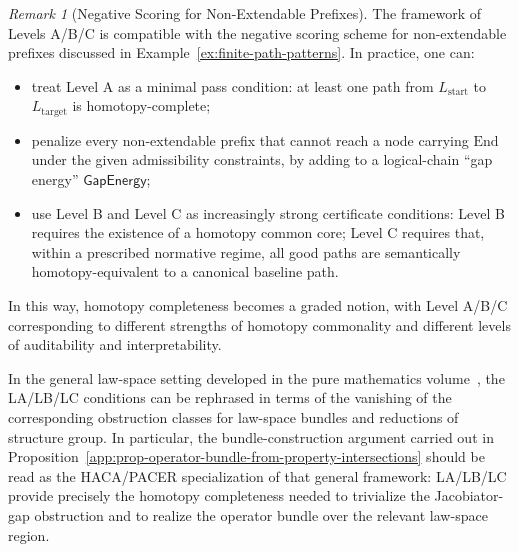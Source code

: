 \documentclass[11pt]{book}
\theoremstyle{plain}
\theoremstyle{definition}
\theoremstyle{remark}
\newtheorem{remark}[theorem]{Remark}
\begin{document}
\begin{remark}[Negative Scoring for Non-Extendable Prefixes]
\label{rem:negative-scoring-nonextendable}
The framework of Levels A/B/C is compatible with the negative scoring
scheme for non-extendable prefixes discussed in
Example~\ref{ex:finite-path-patterns}. In practice, one can:
\begin{itemize}
  \item treat Level A as a minimal pass condition: at least one path from
        $L_{\mathrm{start}}$ to $L_{\mathrm{target}}$ is homotopy-complete;
  \item penalize every non-extendable prefix that cannot reach a node
        carrying $\mathrm{End}$ under the given admissibility constraints,
        by adding to a logical-chain ``gap energy'' $\mathsf{GapEnergy}$;
  \item use Level B and Level C as increasingly strong certificate
        conditions: Level B requires the existence of a homotopy common
        core; Level C requires that, within a prescribed normative regime,
        all good paths are semantically homotopy-equivalent to a canonical
        baseline path.
\end{itemize}
In this way, homotopy completeness becomes a graded notion, with Level A/B/C
corresponding to different strengths of homotopy commonality and different
levels of auditability and interpretability.
\par
In the general law-space setting developed in the pure mathematics
volume~\cite{GaoZheng2025GFramework}, the \\LA/LB/LC conditions can be
rephrased in terms of the vanishing of the corresponding obstruction
classes for law-space bundles and reductions of structure group. In
particular, the bundle-construction argument carried out in
Proposition~\ref{app:prop-operator-bundle-from-property-intersections}
should be read as the HACA/PACER specialization of that general
framework: LA/LB/LC provide precisely the homotopy completeness needed
to trivialize the Jacobiator-gap obstruction and to realize the
operator bundle over the relevant law-space region.
\end{remark}
\end{document}
